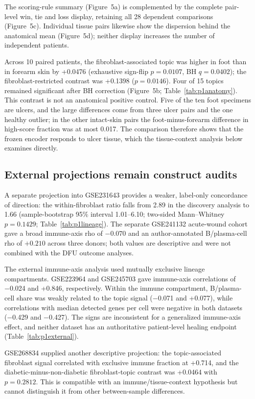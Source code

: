 \documentclass[10pt,a4paper]{article}
\begin{document}
The scoring-rule summary (Figure~5a\label{call:p1f8}) is complemented by the complete pair-level win, tie and loss display, retaining all 28 dependent comparisons (Figure~5c). Individual tissue pairs likewise show the dispersion behind the anatomical mean (Figure~5d); neither display increases the number of independent patients.

Across 10 paired patients, the fibroblast-associated topic was higher in foot than in forearm skin by +0.0476 (exhaustive sign-flip $p=0.0107$, BH $q=0.0402$); the fibroblast-restricted contrast was +0.1398 ($p=0.0146$). Four of 15 topics remained significant after BH correction (Figure~5b; Table~\ref{tab:p1anatomy}). This contrast is not an anatomical positive control. Five of the ten foot specimens are ulcers, and the large differences come from three ulcer pairs and the one healthy outlier; in the other intact-skin pairs the foot-minus-forearm difference in high-score fraction was at most 0.017. The comparison therefore shows that the frozen encoder responds to ulcer tissue, which the tissue-context analysis below examines directly.

\subsection{External projections remain construct audits}

A separate projection into GSE231643 provides a weaker, label-only concordance of direction: the within-fibroblast ratio falls from 2.89 in the discovery analysis to 1.66 (sample-bootstrap 95\% interval 1.01--6.10; two-sided Mann--Whitney $p=0.1429$; Table~\ref{tab:p1lineage}). The separate GSE241132 acute-wound cohort gave a broad immune-axis rho of $-0.070$ and an author-annotated B/plasma-cell rho of $+0.210$ across three donors; both values are descriptive and were not combined with the DFU outcome analyses.

The external immune-axis analysis used mutually exclusive lineage compartments. GSE223964 and GSE245703 gave immune-axis correlations of −0.024 and +0.846, respectively. Within the immune compartment, B/plasma-cell share was weakly related to the topic signal (−0.071 and +0.077), while correlations with median detected genes per cell were negative in both datasets (−0.429 and −0.427). The signs are inconsistent for a generalized immune-axis effect, and neither dataset has an authoritative patient-level healing endpoint (Table~\ref{tab:p1external}).

GSE268834 supplied another descriptive projection: the topic-associated fibroblast signal correlated with exclusive immune fraction at +0.714, and the diabetic-minus-non-diabetic fibroblast-topic contrast was +0.0464 with $p=0.2812$. This is compatible with an immune/tissue-context hypothesis but cannot distinguish it from other between-sample differences.
\end{document}
